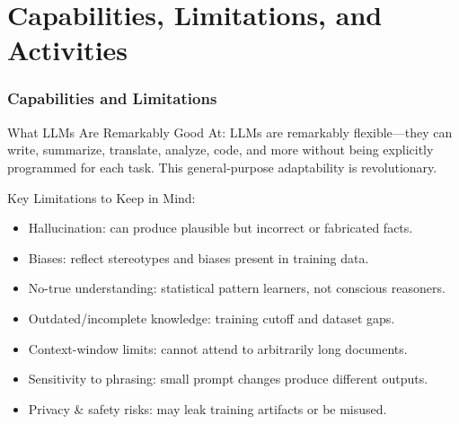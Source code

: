 \documentclass{beamer}
\begin{document}
\section{Capabilities, Limitations, and Activities}

\begin{frame}
    \frametitle{Capabilities and Limitations}
    \begin{block}{What LLMs Are Remarkably Good At:}
        LLMs are remarkably flexible—they can write, summarize, translate, analyze, code, and more without being explicitly programmed for each task. This general-purpose adaptability is revolutionary.
    \end{block}
    
    \begin{block}{Key Limitations to Keep in Mind:}
        \begin{itemize}
            \item Hallucination: can produce plausible but incorrect or fabricated facts.
            \item Biases: reflect stereotypes and biases present in training data.
            \item No-true understanding: statistical pattern learners, not conscious reasoners.
            \item Outdated/incomplete knowledge: training cutoff and dataset gaps.
            \item Context-window limits: cannot attend to arbitrarily long documents.
            \item Sensitivity to phrasing: small prompt changes produce different outputs.
            \item Privacy \& safety risks: may leak training artifacts or be misused.
        \end{itemize}
    \end{block}
\end{frame}
\end{document}
